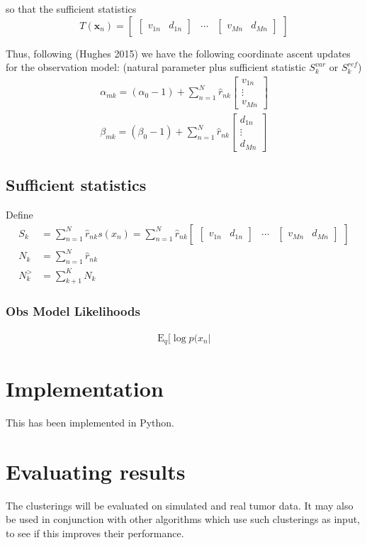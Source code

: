 \documentclass[11pt]{article}
\newcommand{\bx}{\ensuremath{\mathbf{x}}}
\newcommand{\E}{\mathrm{E}}
\begin{document}
so that the sufficient statistics 
\begin{equation}
T(\bx_n) = 
\begin{bmatrix}
				\begin{bmatrix}
				 v_{1n} &  d_{1n}
				\end{bmatrix} & \cdots &
				\begin{bmatrix}
				 v_{Mn} &  d_{Mn}
				\end{bmatrix}
			\end{bmatrix}
\end{equation}

Thus, following (Hughes 2015) we have the following coordinate ascent updates for the observation model: (natural parameter plus sufficient statistic $S_k^{var}$ or $S_k^{ref}$)
\begin{align*}
\alpha_{mk} =  (\alpha_0 - 1) + \sum_{n=1}^N \hat{r}_{nk} \begin{bmatrix} v_{1n} \\ \vdots \\ v_{Mn} \end{bmatrix} \\
\beta_{mk} = (\beta_0 - 1) + \sum_{n=1}^N \hat{r}_{nk} \begin{bmatrix} d_{1n} \\ \vdots \\ d_{Mn} \end{bmatrix}
\end{align*}

\subsection{Sufficient statistics}
Define 
\begin{align}
S_k &= \sum_{n=1}^N \hat{r}_{nk} s(x_n) = \sum_{n=1}^N \hat{r}_{nk} \begin{bmatrix}
				\begin{bmatrix}
				 v_{1n} &  d_{1n}
				\end{bmatrix} & \cdots &
				\begin{bmatrix}
				 v_{Mn} &  d_{Mn}
				\end{bmatrix}
			\end{bmatrix} \\
N_k &= \sum_{n=1}^N \hat{r}_{nk} \\
N_k^> &= \sum_{k+1}^K N_k
\end{align}

\subsubsection{Obs Model Likelihoods}
\begin{align*}
\E_q[\log p(x_n | 
\end{align*}

\section{Implementation}
This has been implemented in Python.

\section{Evaluating results}

The clusterings will be evaluated on simulated and real tumor data. It may also be used in conjunction with other algorithms which use such clusterings as input, to see if this improves their performance.
\end{document}
